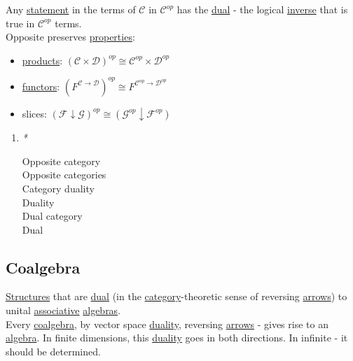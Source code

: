 \documentclass[a4paper,14pt,oneside]{book}
\begin{document}
Any \hyperref[orgef7434f]{statement} in the terms of \(\mathcal{C}\) in \(\mathcal{C}^{op}\) has the \hyperref[orgc6963f2]{dual} - the logical \hyperref[orgeb3638a]{inverse} that is true in \(\mathcal {C}^{op}\) terms.\\

Opposite preserves \hyperref[orge0a1a8a]{properties}:\\
\begin{itemize}
\item \hyperref[org282cbfc]{products}: \((\mathcal{C} \times \mathcal{D})^{op} \cong \mathcal{C}^{op} \times \mathcal{D}^{op}\)\\

\item \hyperref[org8f42943]{functors}: \((F^{\mathcal{C} \to \mathcal{D}})^{op} \cong F^{\mathcal{C}^{op} \to \mathcal{D}^{op}}\)\\

\item slices: \((\mathcal{F} \downarrow \mathcal{G})^{op} \cong (\mathcal{G}^{op} \downarrow \mathcal{F}^{op})\)\\
\end{itemize}

\begin{enumerate}
\item \emph{*}
\label{sec:org5ef0fe6}

\label{orgd1ddee6}Opposite category\\
\label{org89626eb}Opposite categories\\
\label{org13eea69}Category duality\\
\label{org667ca45}Duality\\
\label{org0f07f42}Dual category\\
\label{orgc6963f2}Dual\\
\end{enumerate}

\subsection{\label{org6a67ed2}Coalgebra}
\label{sec:org2fff78f}
\hyperref[org2c7f064]{Structures} that are \hyperref[orgc6963f2]{dual} (in the \hyperref[org3a5c6d7]{category}-theoretic sense of reversing \hyperref[org224bb22]{arrows}) to unital \hyperref[orgfe56caa]{associative} \hyperref[org9dbd815]{algebras}.\\
Every \hyperref[org6a67ed2]{coalgebra}, by vector space \hyperref[org667ca45]{duality}, reversing \hyperref[org224bb22]{arrows} - gives rise to an \hyperref[orgf52fcf3]{algebra}. In finite dimensions, this \hyperref[org667ca45]{duality} goes in both directions. In infinite - it should be determined.\\
\end{document}
